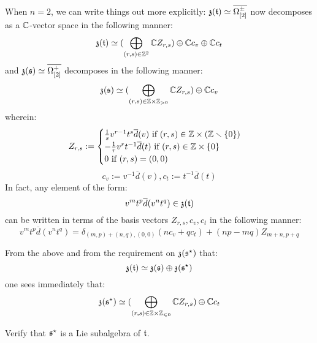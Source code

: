 \begin{remark}
                When $n = 2$, we can write things out more explicitly: $\mathfrak{z}(\mathfrak{t}) \simeq \overline{\Omega_{[2]}^{\pm}}$ now decomposes as a $\mathbb{C}$-vector space in the following manner:
                    $$\mathfrak{z}(\mathfrak{t}) \simeq ( \bigoplus_{(r, s) \in \mathbb{Z}^2} \mathbb{C} Z_{r, s}) \oplus \mathbb{C} c_v \oplus \mathbb{C} c_t$$
                and $\mathfrak{z}(\mathfrak{s}) \simeq \overline{\Omega_{[2]}^+}$ decomposes in the following manner:
                    $$\z(\s) \cong ( \bigoplus_{(r, s) \in \Z \x \Z_{> 0}} \bbC Z_{r, s}) \oplus \bbC c_v$$
                wherein:
                    $$
                        Z_{r, s} :=
                        \begin{cases}
                            \text{$\frac1s v^{r - 1} t^s \overline{d}(v)$ if $(r, s) \in \Z \x (\Z \setminus \{0\})$}
                            \\
                            \text{$-\frac1r v^r t^{-1} \overline{d}(t)$ if $(r, s) \in \Z \x \{0\}$}
                            \\
                            \text{$0$ if $(r, s) = (0, 0)$}
                        \end{cases}
                    $$
                    $$c_v := v^{-1} \overline{d}(v), c_t := t^{-1} \overline{d}(t)$$
                In fact, any element of the form:
                    $$v^m t^p \overline{d}(v^n t^q) \in \mathfrak{z}(\mathfrak{t})$$
                can be written in terms of the basis vectors $Z_{r, s}, c_v, c_t$ in the following manner:
                    $$v^m t^p \overline{d}(v^n t^q) = \delta_{(m, p) + (n, q), (0, 0)} ( n c_v + q c_t ) + (np - mq) Z_{m + n, p + q}$$

                From the above and from the requirement on $\mathfrak{z}(\mathfrak{s}^{\star})$ that:
                    $$\mathfrak{z}(\mathfrak{t}) \simeq \mathfrak{z}(\mathfrak{s}) \oplus \mathfrak{z}(\mathfrak{s}^{\star})$$
                one sees immediately that:
                    $$\z(\s^{\star}) \cong ( \bigoplus_{(r, s) \in \Z \x \Z_{\leq 0}} \bbC Z_{r, s}) \oplus \bbC c_t$$
            \end{remark}
            \begin{question} \label{question: toroidal_dual}
                Verify that $\mathfrak{s}^{\star}$ is a Lie subalgebra of $\mathfrak{t}$.
            \end{question}
